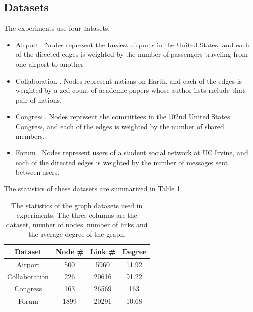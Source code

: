 \documentclass[12pt]{WSUThesis}
\theoremstyle{definition}
\begin{document}
\subsection{Datasets}
The experiments use four datasets:
\begin{itemize}
	\item Airport \cite{colizza2007reaction}. Nodes represent the busiest airports in the United States, and each of the directed edges is weighted by the number of passengers traveling from one airport to another.
	\item Collaboration \cite{pan2012world}. Nodes represent nations on Earth, and each of the edges	is weighted by a zed count of academic papers whose author lists include that pair of nations.
	\item Congress \cite{porter2005network}. Nodes represent the committees in the 102nd United States Congress, and each of the edges is weighted by the number of shared members.
	\item Forum \cite{opsahl2009clustering}. Nodes represent users of a student social network at UC Irvine, and each of the directed edges is weighted by the number of messages sent between users.
\end{itemize}
The statistics of these datasets are summarized in Table \ref{tab:datasets}.
\begin{table}[!ht]\centering
	\caption{
		The statistics of the graph datasets used in experiments.
		The three columns are the dataset, number of nodes, number of links and the average degree of the graph.
	}
	\begin{tabular}{cccc}  \hline
		Dataset & Node \# & Link \# & Degree \\ \hline
		Airport & 500 & 5960 & 11.92 \\ \hline
		Collaboration & 226 & 20616 & 91.22 \\ \hline
		Congress & 163 & 26569 & 163 \\ \hline
		Forum  & 1899 & 20291 & 10.68 \\ \hline
	\end{tabular}
	\label{tab:datasets}
\end{table}
\end{document}

